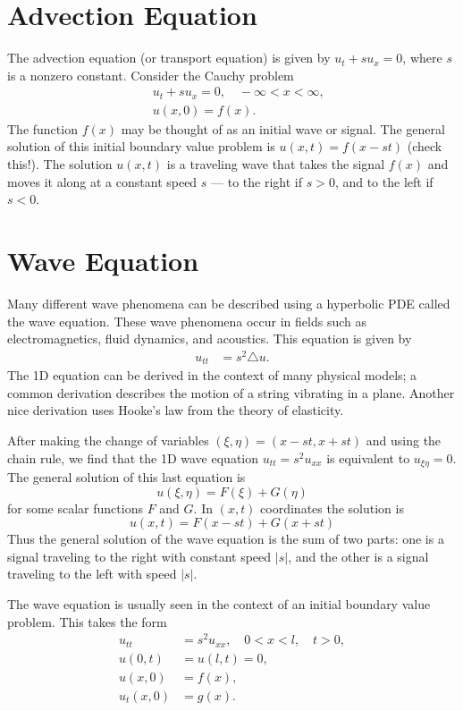 \label{lab:waveeqn}

\section*{Advection Equation}
The advection equation (or transport equation) is given by $u_t + s u_x = 0$, where $s$ is a nonzero constant.
Consider the Cauchy problem
\begin{align*}
	& u_t + su_x = 0, \quad -\infty < x < \infty,\\\
	& u(x,0) = f(x).
\end{align*}
The function $f(x)$ may be thought of as an initial wave or signal.
The general solution of this initial boundary value problem is $u(x,t) = f(x-st)$ (check this!).
The solution $u(x,t)$ is a traveling wave that takes the signal $f(x)$ and moves it along at a constant speed $s$ --- to the right if $s > 0$, and to the left if $s < 0$.

\section*{Wave Equation}
Many different wave phenomena can be described using a hyperbolic PDE called the wave equation.
These wave phenomena occur in fields such as electromagnetics, fluid dynamics, and acoustics.
This equation is given by
\begin{align}
	u_{tt} &= s^2 \triangle u.
\end{align}
The 1D equation can be derived in the context of many physical models; a common derivation describes the motion of a string vibrating in a plane.
Another nice derivation uses Hooke's law from the theory of elasticity.

After making the change of variables $(\xi,\eta) = (x-st, x + st)$ and using the chain rule, we find that the 1D wave equation $u_{tt} = s^2 u_{xx}$ is equivalent to $u_{\xi \eta} = 0$.
The general solution of this last equation is
\[u(\xi, \eta) = F(\xi) + G(\eta)\]
for some scalar functions $F$ and $G$.
In $(x,t)$ coordinates the solution is
\[u(x,t) = F(x-st) + G(x+st)\]
Thus the general solution of the wave equation is the sum of two parts: one is a signal traveling to the right with constant speed $|s|$, and the other is a signal traveling to the left with speed $|s|$.

The wave equation is usually seen in the context of an initial boundary value problem.
This takes the form
\begin{align*}
	u_{tt} &= s^2 u_{xx}, \quad 0 < x < l, \quad t > 0,\\
	u(0,t) &= u(l,t) = 0, \\
	u(x,0) &= f(x),\\
	u_t(x,0) &= g(x).
\end{align*}

